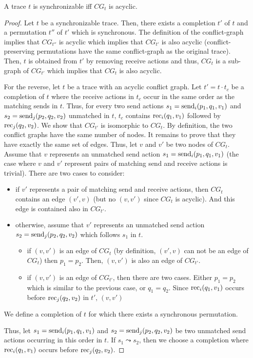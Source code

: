 \begin{theorem}\label{thm:cg} 
A trace $t$ is synchronizable if{f} $CG_t$ is acyclic.
\end{theorem}
\begin{proof}
Let $t$ be a synchronizable trace. Then, there exists a completion $t'$ of $t$ and a permutation $t''$ of $t'$ which is synchronous. The definition of the conflict-graph implies that $CG_{t''}$ is acyclic which implies that $CG_{t'}$ is also acyclic (conflict-preserving permutations have the same conflict-graph as the original trace). Then, $t$ is obtained from $t'$ by removing receive actions and thus, $CG_{t}$ is a sub-graph of $CG_{t'}$ which implies that $CG_{t}$ is also acyclic.

For the reverse, let $t$ be a trace with an acyclic conflict graph. Let $t'=t\cdot t_c$ be a completion of $t$ where the receive actions in $t_c$ occur in the same order as the matching sends in $t$. Thus, for every two send actions $s_1=\mathrm{send}_{i}({p_1,q_1,v_1})$ and $s_2=\mathrm{send}_{j}({p_2,q_2,v_2})$ unmatched in $t$, $t_c$ contains $\mathrm{rec}_{i}({q_1,v_1})$ followed by $\mathrm{rec}_{j}({q_2,v_2})$. We show that $CG_{t'}$ is isomorphic to $CG_{t}$. By definition, the two conflict graphs have the same number of nodes. It remains to prove that they have exactly the same set of edges. Thus, let $v$ and $v'$ be two nodes of $CG_{t}$. Assume that $v$ represents an unmatched send action $s_1=\mathrm{send}_{i}({p_1,q_1,v_1})$ (the case where $v$ and $v'$ represent pairs of matching send and receive actions is trivial).
There are two cases to consider:
\begin{itemize}
	\item if $v'$ represents a pair of matching send and receive actions, then $CG_{t}$ contains an edge $(v',v)$ (but no $(v,v')$ since $CG_{t}$ is acyclic). And this edge is contained also in $CG_{t'}$.
	\item otherwise, assume that $v'$ represents an unmatched send action $s_2=\mathrm{send}_{j}({p_2,q_2,v_2})$ which follows $s_1$ in $t$. 
	\begin{itemize}
		\item if $(v,v')$ is an edge of $CG_{t}$ (by definition, $(v',v)$ can not be an edge of $CG_{t}$) then $p_1=p_2$. Then, $(v,v')$ is also an edge of $CG_{t'}$.
		\item if $(v,v')$ is an edge of $CG_{t'}$, then there are two cases. Either $p_1=p_2$ which is similar to the previous case, or $q_1=q_2$.
		Since $\mathrm{rec}_{i}({q_1,v_1})$ occurs before $\mathrm{rec}_{j}({q_2,v_2})$ in $t'$, $(v,v')$
	\end{itemize}
\end{itemize}


We define a completion of $t$ for which there exists a synchronous permutation. 


Thus, let $s_1=\mathrm{send}_{i}({p_1,q_1,v_1})$ and $s_2=\mathrm{send}_{j}({p_2,q_2,v_2})$ be two unmatched send actions occurring in this order in $t$. If $s_1\leadsto s_2$, then we choose a completion where $\mathrm{rec}_{i}({q_1,v_1})$ occurs before $\mathrm{rec}_{j}({q_2,v_2})$.
\end{proof}



